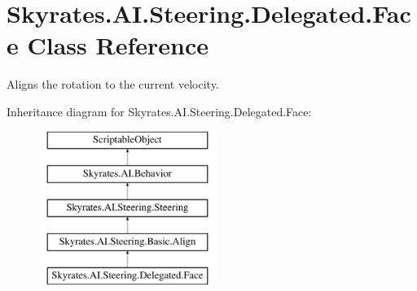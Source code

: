 \hypertarget{class_skyrates_1_1_a_i_1_1_steering_1_1_delegated_1_1_face}{\section{Skyrates.\-A\-I.\-Steering.\-Delegated.\-Face Class Reference}
\label{class_skyrates_1_1_a_i_1_1_steering_1_1_delegated_1_1_face}
}


Aligns the rotation to the current velocity.  


Inheritance diagram for Skyrates.\-A\-I.\-Steering.\-Delegated.\-Face\-:\begin{figure}[H]
\begin{center}
\leavevmode
\includegraphics[height=5.000000cm]{class_skyrates_1_1_a_i_1_1_steering_1_1_delegated_1_1_face}
\end{center}
\end{figure}
